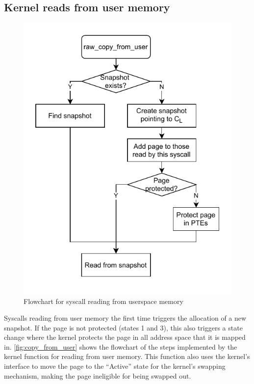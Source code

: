 \documentclass[letterpaper,twocolumn,10pt, anonymous]{article}
\begin{document}
\subsection{Kernel reads from user memory}

\begin{figure}[]
  \centering
  \includegraphics[width=0.8\linewidth]{img/copy_from_user.pdf}
  \caption{Flowchart for syscall reading from userspace memory}
  \label{fig:copy_from_user}
\end{figure}

Syscalls reading from user memory the first time triggers the 
allocation of a new snapshot. 
If the page is not protected (states 1 and 3), this also 
triggers a state change where the kernel protects the page
in all address space that it is mapped in. 
\autoref{fig:copy_from_user} shows the flowchart of the steps
implemented by the kernel function  for 
reading from user memory.
This function also uses the kernel's  
interface to move the page to the ``Active'' state for the 
kernel's swapping mechanism, making the page ineligible for being 
swapped out.
\end{document}
